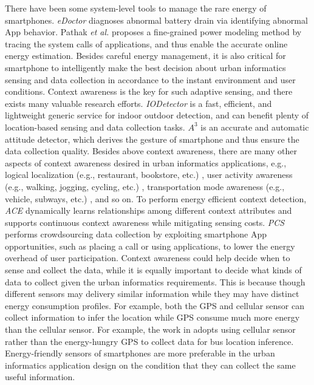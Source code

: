 There have been some system-level tools to manage the rare energy of smartphones. \textit{eDoctor} \cite{edoctor} diagnoses abnormal battery drain via identifying abnormal App behavior. Pathak \textit{et al.} \cite{power} proposes a fine-grained power modeling method by tracing the system calls of applications, and thus enable the accurate online energy estimation. Besides careful energy management, it is also critical for smartphone to intelligently make the best decision about urban informatics sensing and data collection in accordance to the instant environment and user conditions. Context awareness is the key for such adaptive sensing, and there exists many valuable research efforts. \textit{IODetector} \cite{iodetector} is a fast, efficient, and lightweight generic service for indoor outdoor detection, and can benefit plenty of location-based sensing and data collection tasks. \textit{$A^3$} \cite{attitude} is an accurate and automatic attitude detector, which derives the gesture of smartphone and thus ensure the data collection quality. Besides above context awareness, there are many other aspects of context awareness desired in urban informatics applications, e.g., logical localization (e.g., restaurant, bookstore, etc.) \cite{surroundsense}, user activity awareness (e.g., walking, jogging, cycling, etc.) \cite{activity}, transportation mode awareness (e.g., vehicle, subways, etc.) \cite{transportation}, and so on. To perform energy efficient context detection, \textit{ACE} \cite{ace} dynamically learns relationships among different context attributes and supports continuous context awareness while mitigating sensing costs. \textit{PCS} \cite{piggyback} performs crowdsourcing data collection by exploiting smartphone App opportunities, such as placing a call or using applications, to lower the energy overhead of user participation. Context awareness could help decide when to sense and collect the data, while it is equally important to decide what kinds of data to collect given the urban informatics requirements. This is because though different sensors may delivery similar information while they may have distinct energy consumption profiles. For example, both the GPS and cellular sensor can collect information to infer the location while GPS consume much more energy than the cellular sensor. For example, the work in \cite{bustime} adopts using cellular sensor rather than the energy-hungry GPS to collect data for bus location inference. Energy-friendly sensors of smartphones are more preferable in the urban informatics application design on the condition that they can collect the same useful information.

